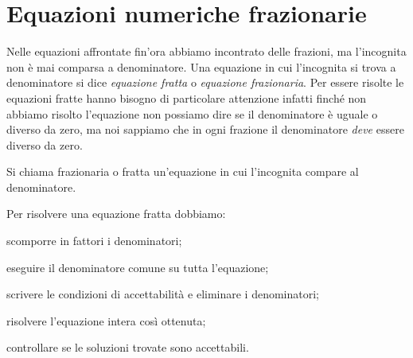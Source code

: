 
% 

\section{Equazioni numeriche frazionarie}
\label{sec:compl1_eqfratte}

Nelle equazioni affrontate fin'ora abbiamo incontrato delle frazioni, ma 
l'incognita non è mai comparsa a denominatore. Una equazione in cui 
l'incognita si trova a denominatore si dice \emph{equazione fratta} o
\emph{equazione frazionaria}. Per essere risolte le equazioni fratte hanno 
bisogno di particolare attenzione infatti finché non abbiamo risolto 
l'equazione non possiamo dire se il denominatore è uguale o diverso da zero, 
ma noi sappiamo che in ogni frazione il denominatore \emph{deve} essere 
diverso da zero. 

\begin{definizione} 
Si chiama frazionaria o fratta un'equazione in cui l'incognita compare 
al denominatore.
\end{definizione}

\begin{procedura}
Per risolvere una equazione fratta dobbiamo:
\begin{enumerate*}
\item scomporre in fattori i denominatori;
\item eseguire il denominatore comune su tutta l'equazione;
\item scrivere le condizioni di accettabilità e eliminare i denominatori;
\item risolvere l'equazione intera così ottenuta;
\item controllare se le soluzioni trovate sono accettabili.
\end{enumerate*}
\end{procedura}


